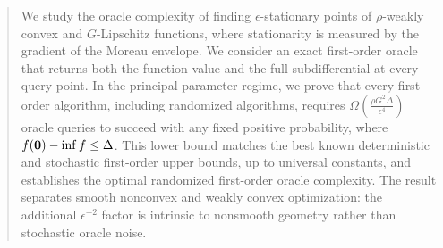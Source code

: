 \author{Jiajin Li   \and
        Siyu Pan
}



\date{Received: date / Accepted: date}


\maketitle





\begin{abstract}
We study the oracle complexity of finding $\epsilon$-stationary
points of $\rho$-weakly convex and $G$-Lipschitz functions,
where stationarity is measured by the gradient of the Moreau
envelope. We consider an exact first-order oracle that returns both
the function value and the full subdifferential at every
query point. In the principal parameter regime, we prove that every
first-order algorithm, including randomized algorithms,
requires $\Omega(\tfrac{\rho G^2\Delta}{\epsilon^4})$ oracle queries
to succeed with any fixed positive probability, where
$f(\bz)-\inf f\le\Delta$. This lower bound matches the best known deterministic
and stochastic first-order upper bounds, up to universal
constants, and establishes the optimal randomized
first-order oracle complexity. The result separates smooth nonconvex and  weakly
convex optimization: the additional $\epsilon^{-2}$ factor
is intrinsic to nonsmooth geometry rather than stochastic
oracle noise.




\end{abstract}

